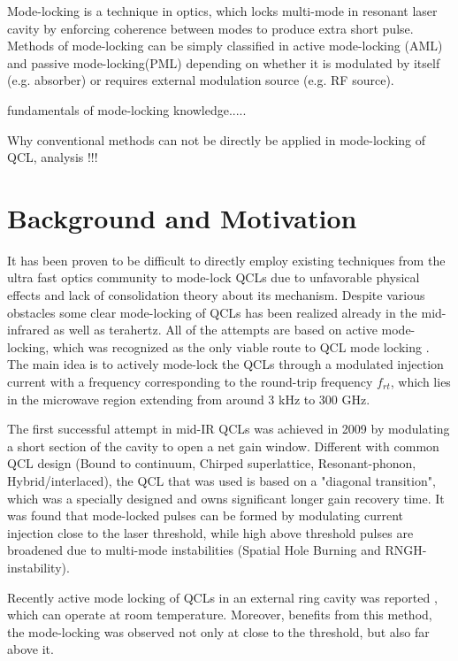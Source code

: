 \documentclass[11pt,final]{scrbook}
\begin{document}
Mode-locking is a technique in optics, which locks multi-mode in resonant laser cavity by enforcing coherence between modes to produce extra short pulse\cite{haus2000mode}. Methods of mode-locking can be simply classified in active mode-locking (AML) and passive mode-locking(PML) depending on whether it is modulated by itself (e.g. absorber) or requires external modulation source (e.g. RF source).

fundamentals of mode-locking knowledge.....

Why conventional methods can not be directly be applied in mode-locking of QCL, analysis !!!

\section{Background and Motivation}
It has been proven to be difficult to directly employ existing techniques from the ultra fast optics community to mode-lock QCLs due to unfavorable physical effects and lack of consolidation theory about its mechanism. Despite various obstacles some clear mode-locking of QCLs has been realized already in the mid-infrared as well as terahertz. All of the attempts are based on active mode-locking, which was recognized as the only viable route to QCL mode locking \cite{revin2016active}. The main idea is to actively mode-lock the QCLs through a modulated injection current with a frequency corresponding to the round-trip frequency $f_{rt}$, which lies in the microwave region extending from around 3 kHz to 300 GHz.

The first successful attempt in mid-IR QCLs was achieved in 2009 \cite{wang2009mode} by modulating a short section of the cavity to open a net gain window. Different with common QCL design (Bound to continuum, Chirped superlattice, Resonant-phonon, Hybrid/interlaced), the QCL that was used is based on a "diagonal transition", which was a specially designed and owns significant longer gain recovery time. It was found that mode-locked pulses can be formed by modulating current injection close to the laser threshold, while high above threshold pulses are broadened due to multi-mode instabilities (Spatial Hole Burning and RNGH-instability).

Recently active mode locking of QCLs in an external ring cavity was reported \cite{revin2016active}, which can operate at room temperature. Moreover, benefits from this method, the mode-locking was observed not only at close to the threshold, but also far above it. 
\end{document}
